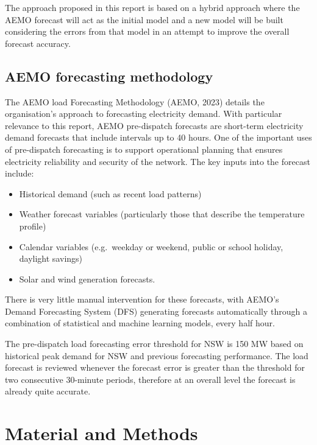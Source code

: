 \documentclass[mstat,12pt]{unswthesis}
\begin{document}
\bigskip

The approach proposed in this report is based on a hybrid approach where the AEMO forecast will act as the initial model and a new model will be built considering the errors from that model in an attempt to improve the overall forecast accuracy.

\section{AEMO forecasting methodology}\label{aemo-forecasting-methodology}

The AEMO load Forecasting Methodology (AEMO, 2023) details the organisation's approach to forecasting electricity demand. With particular relevance to this report, AEMO pre-dispatch forecasts are short-term electricity demand forecasts that include intervals up to 40 hours. One of the important uses of pre-dispatch forecasting is to support operational planning that ensures electricity reliability and security of the network. The key inputs into the forecast include:

\begin{itemize}
\item
  Historical demand (such as recent load patterns)
\item
  Weather forecast variables (particularly those that describe the temperature profile)
\item
  Calendar variables (e.g.~weekday or weekend, public or school holiday, daylight savings)
\item
  Solar and wind generation forecasts.
\end{itemize}

\bigskip

There is very little manual intervention for these forecasts, with AEMO's Demand Forecasting System (DFS) generating forecasts automatically through a combination of statistical and machine learning models, every half hour.

\bigskip

The pre-dispatch load forecasting error threshold for NSW is 150 MW based on historical peak demand for NSW and previous forecasting performance. The load forecast is reviewed whenever the forecast error is greater than the threshold for two consecutive 30-minute periods, therefore at an overall level the forecast is already quite accurate.

\chapter{Material and Methods}\label{material-and-methods}
\end{document}
